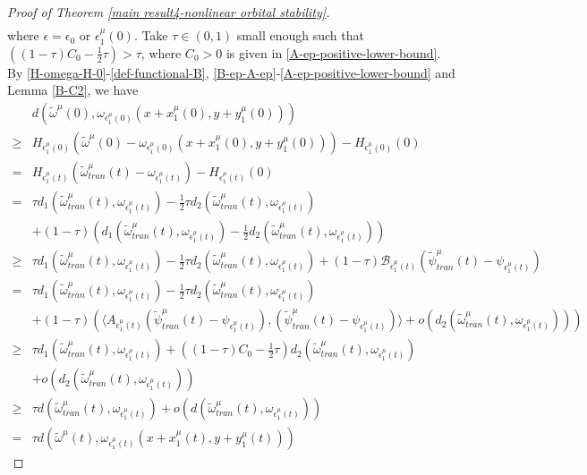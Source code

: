 \documentclass[1 [leqno, 11pt]{amsart}
\numberwithin{equation}{section}
\let\ep=\epsilon
\begin{document}
\begin{CJK*}{GBK}{song}
\begin{proof}[Proof of  Theorem \ref{main result4-nonlinear orbital stability}]
\begin{align*}
\end{align*}
where $\ep=\ep_0$ or $\ep_1^\mu(0)$.
Take $\tau\in(0,1)$ small enough such that  $\left(  (1-\tau) C_0- \frac 1 2 \tau\right)>\tau$, where
$C_0>0$ is given in \eqref{A-ep-positive-lower-bound}.
By \eqref{H-omega-H-0}-\eqref{def-functional-B}, \eqref{B-ep-A-ep}-\eqref{A-ep-positive-lower-bound} and Lemma \ref{B-C2}, we have
\begin{align}\nonumber
& d(\tilde \omega^\mu(0),\omega_{\ep_1^\mu(0)}(x+x_1^\mu(0),y+y_1^\mu(0)))\\\nonumber
\geq&H_{\ep_1^\mu(0)}(\tilde \omega^\mu(0)-\omega_{\ep_1^\mu(0)}(x+x_1^\mu(0),y+y_1^\mu(0))) - H_{\ep_1^\mu(0)}(0)\\\nonumber
 =&H_{\ep_1^\mu(t)}(\tilde \omega_{tran}^\mu(t)-\omega_{\ep_1^\mu(t)}) - H_{\ep_1^\mu(t)}(0)\\\nonumber
 =&
 \tau d_1(\tilde \omega_{tran}^\mu(t),\omega_{\ep_1^\mu(t)}) - \frac 1 2 \tau d_2(\tilde \omega_{tran}^\mu(t),\omega_{\ep_1^\mu(t)}) \\\nonumber
 &+ (1-\tau) \left( d_1(\tilde \omega_{tran}^\mu(t),\omega_{\ep_1^\mu(t)}) - \frac 1 2  d_2(\tilde \omega_{tran}^\mu(t),\omega_{\ep_1^\mu(t)})\right) \\\nonumber
 \geq& \tau d_1(\tilde \omega_{tran}^\mu(t),\omega_{\ep_1^\mu(t)}) - \frac 1 2 \tau d_2(\tilde \omega_{tran}^\mu(t),\omega_{\ep_1^\mu(t)})
 + (1-\tau) \mathscr{B}_{\ep_1^\mu(t)}(\tilde \psi_{tran}^\mu(t)-\psi_{\ep_1^\mu(t)})\\\nonumber
 =&\tau d_1(\tilde \omega_{tran}^\mu(t),\omega_{\ep_1^\mu(t)}) - \frac 1 2 \tau d_2(\tilde \omega_{tran}^\mu(t),\omega_{\ep_1^\mu(t)})\\\nonumber
& + (1-\tau) \left(\langle A_{\ep_1^\mu(t)}(\tilde \psi_{tran}^\mu(t)-\psi_{\ep_1^\mu(t)}),(\tilde \psi_{tran}^\mu(t)-\psi_{\ep_1^\mu(t)})\rangle+o(d_2(\tilde \omega_{tran}^\mu(t),\omega_{\ep_1^\mu(t)}))\right)\\\nonumber
\geq&\tau d_1(\tilde \omega_{tran}^\mu(t),\omega_{\ep_1^\mu(t)})+\left(  (1-\tau) C_0- \frac 1 2 \tau\right) d_2(\tilde \omega_{tran}^\mu(t),\omega_{\ep_1^\mu(t)})\\\nonumber
&+o(d_2(\tilde \omega_{tran}^\mu(t),\omega_{\ep_1^\mu(t)}))\\\nonumber
\geq&\tau d(\tilde \omega_{tran}^\mu(t),\omega_{\ep_1^\mu(t)})+o(d(\tilde \omega_{tran}^\mu(t),\omega_{\ep_1^\mu(t)}))\\\label{t control by 0-Taylor of dual functional}
=&\tau d(\tilde \omega^\mu(t),\omega_{\ep_1^\mu(t)}(x+x_1^\mu(t),y+y_1^\mu(t)))

\end{align}
\end{proof}
\end{CJK*}
\end{document}

